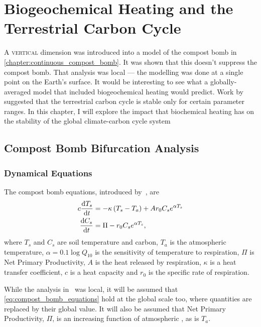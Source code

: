\chapter{Biogeochemical Heating and the Terrestrial Carbon Cycle}
\label{chapter:global_bomb}
\graphicspath{{global_bomb/figs/}}

\lettrine[lines=3,loversize=0.1,findent=-0.9em,nindent=0.5em,slope=0.6em]{A}{ vertical} dimension was introduced into a model of the compost
bomb in \cref{chapter:continuous_compost_bomb}. It was shown that this doesn't
suppress the compost bomb. That analysis was local ---  the modelling was done at a single point on the Earth's surface. It would be interesting to see
what a globally-averaged model that included biogeochemical heating would predict. Work by~\cite{Cox2006} suggested that the terrestrial carbon cycle is stable
only for certain parameter ranges. 
In this chapter, I will explore the impact that biochemical heating has on the stability of the global climate-carbon cycle system
\section{Compost Bomb Bifurcation Analysis}

\subsection{Dynamical Equations}
The compost bomb equations, introduced by~\cite{Luke2011}, are
\begin{subequations}
  \label{eq:compost_bomb_equations}
  \begin{align}
    c \dv{T_s}{t} &= - \kappa \left(T_s - T_a\right) + Ar_0C_se^{\alpha T_s} \label{eq:compost_bomb_soil_temperature} \\
    \dv{C_s}{t} &= \Pi - r_0C_se^{\alpha T_s}, \label{eq:compost_bomb_soil_carbon}
  \end{align}
\end{subequations}
where $T_s$ and $C_s$ are soil temperature and carbon, $T_a$ is the atmospheric temperature, $\alpha = 0.1\log Q_{10}$ is the sensitivity of
temperature to respiration, $\Pi$ is Net Primary Productivity, $A$ is the heat released by respiration, $\kappa$ is a heat transfer coefficient,
$c$ is a heat capacity and $r_0$ is the specific rate of respiration.

While the analysis in~\cite{Luke2011} was local, it will be assumed that \cref{eq:compost_bomb_equations} hold at the global scale too, where quantities are
replaced by their global value. It will also be assumed that Net Primary Productivity, $\Pi$, is an increasing function of atmospheric , as is $T_a$. 

